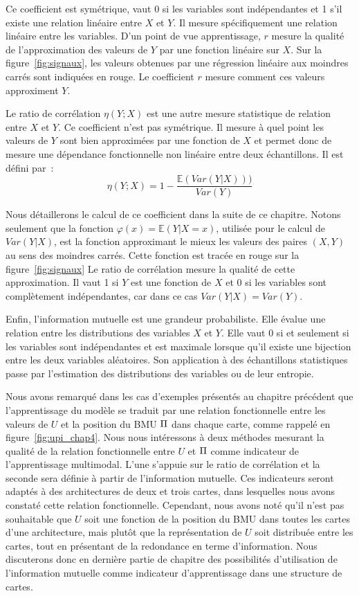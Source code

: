 \documentclass[../main]{subfiles}
\begin{document}
Ce coefficient est symétrique, vaut 0 si les variables sont indépendantes et 1 s'il existe une relation linéaire entre $X$ et $Y$. Il mesure spécifiquement une relation linéaire entre les variables. 
D'un point de vue apprentissage, $r$ mesure la qualité de l'approximation des valeurs de $Y$ par une fonction linéaire sur $X$. 
Sur la figure~\ref{fig:signaux}, les valeurs obtenues par une régression linéaire aux moindres carrés sont indiquées en rouge. Le coefficient $r$ mesure comment ces valeurs approximent $Y$. 

Le ratio de corrélation $\eta(Y;X)$ est une autre mesure statistique de relation entre $X$ et $Y$. Ce coefficient n'est pas symétrique. 
Il mesure à quel point les valeurs de $Y$ sont bien approximées par une fonction de $X$ et permet donc de mesure une dépendance fonctionnelle non linéaire entre deux échantillons.
Il est défini par~:
\begin{equation}
    \eta(Y;X) = 1 - \frac{\mathbb{E}(Var(Y|X)))}{Var(Y)}
\end{equation}

Nous détaillerons le calcul de ce coefficient dans la suite de ce chapitre. Notons seulement que la fonction $\varphi(x) = \mathbb{E}(Y|X = x)$, utilisée pour le calcul de $Var(Y|X)$, est la fonction approximant le mieux les valeurs des paires $(X,Y)$ au sens des moindres carrés. Cette fonction est tracée en rouge sur la figure~\ref{fig:signaux}
Le ratio de corrélation mesure la qualité de cette approximation. Il vaut 1 si $Y$ est une fonction de $X$ et 0 si les variables sont complètement indépendantes, car dans ce cas $Var(Y|X) = Var(Y)$.

Enfin, l'information mutuelle est une grandeur probabiliste.
Elle évalue une relation entre les distributions des variables $X$ et $Y$. Elle vaut 0 si et seulement si les variables sont indépendantes et est maximale lorsque qu'il existe une bijection entre les deux variables aléatoires.
Son application à des échantillons statistiques passe par l'estimation des distributions des variables ou de leur entropie.

Nous avons remarqué dans les cas d'exemples présentés au chapitre précédent que l'apprentissage du modèle se traduit par une relation fonctionnelle entre les valeurs de $U$ et la position du BMU $\Pi$ dans chaque carte, comme rappelé en figure~\ref{fig:upi_chap4}.
Nous nous intéressons à deux méthodes mesurant la qualité de la relation fonctionnelle entre $U$ et $\Pi$ comme indicateur de l'apprentissage multimodal. L'une s'appuie sur le ratio de corrélation et la seconde sera définie à partir de l'information mutuelle.
Ces indicateurs seront adaptés à des architectures de deux et trois cartes, dans lesquelles nous avons constaté cette relation fonctionnelle. 
Cependant, nous avons noté qu'il n'est pas souhaitable que $U$ soit une fonction de la position du BMU dans toutes les cartes d'une architecture, mais plutôt que la représentation de $U$ soit distribuée entre les cartes, tout en présentant de la redondance en terme d'information.
Nous discuterons donc en dernière partie de chapitre des possibilités d'utilisation de l'information mutuelle comme indicateur d'apprentissage dans une structure de cartes.
\end{document}
